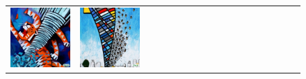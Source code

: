 \begin{figure}[ht!]
\begin{adjustwidth}{-0.8in}{-0.5in}
\begin{tabular}{cccccccccccccccccccc}
\multicolumn{2}{c}{\includegraphics[width=\threebythreecolwidth\textwidth]{figures/cherries/tiger_cubism.jpg}} &
\multicolumn{2}{c}{\includegraphics[width=\threebythreecolwidth\textwidth]{figures/cherries/bees_cubism.jpg}} &&

\end{tabular}
\end{adjustwidth}
\end{figure}
